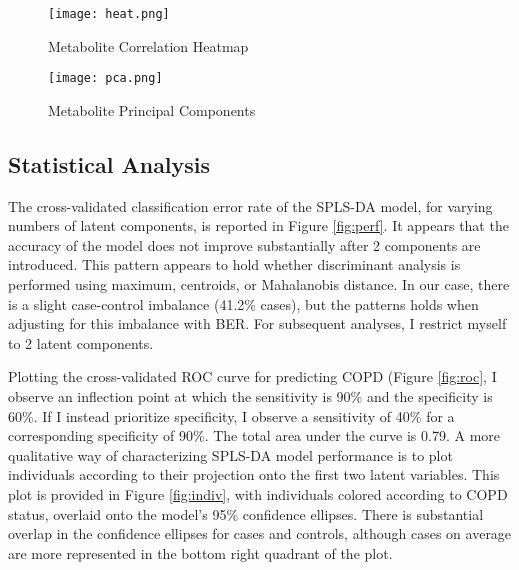 \documentclass{article}
\begin{document}
\begin{figure}
  \centering
  \caption{Metabolite Correlation Heatmap}
  \texttt{[image: heat.png]}
  \label{fig:heat}
  \end{figure}

\begin{figure}
  \caption{Metabolite Principal Components}
  \texttt{[image: pca.png]}
  \centering
  \label{fig:pca}
  \end{figure}

\subsection*{Statistical Analysis}

The cross-validated classification error rate of the SPLS-DA model, for varying numbers of latent components, is reported in Figure \ref{fig:perf}. It appears that the accuracy of the model does not improve substantially after 2 components are introduced. This pattern appears to hold whether discriminant analysis is performed using maximum, centroids, or Mahalanobis distance. In our case, there is a slight case-control imbalance (41.2\% cases), but the patterns holds when adjusting for this imbalance with BER. For subsequent analyses, I restrict myself to 2 latent components.

Plotting the cross-validated ROC curve for predicting COPD (Figure \ref{fig:roc}, I observe an inflection point at which the sensitivity is 90\% and the specificity is 60\%. If I instead prioritize specificity, I observe a sensitivity of 40\% for a corresponding specificity of 90\%. The total area under the curve is 0.79. A more qualitative way of characterizing SPLS-DA model performance is to plot individuals according to their projection onto the first two latent variables. This plot is provided in Figure \ref{fig:indiv}, with individuals colored according to COPD status, overlaid onto the model's 95\% confidence ellipses. There is substantial overlap in the confidence ellipses for cases and controls, although cases on average are more represented in the bottom right quadrant of the plot.
\end{document}
